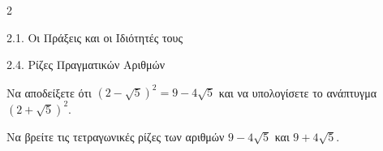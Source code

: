 \begin{ylh}{2}
    \item 2.1. Οι Πράξεις και οι Ιδιότητές τους
    \item 2.4. Ρίζες Πραγματικών Αριθμών
\end{ylh}

\begin{alist}
\item Να αποδείξετε ότι $(2 - \sqrt{5})^2 = 9 - 4\sqrt{5}$ και να υπολογίσετε το ανάπτυγμα $(2 + \sqrt{5})^2$. 
\item Να βρείτε τις τετραγωνικές ρίζες των αριθμών $9 - 4\sqrt{5}$ και $9 + 4\sqrt{5}$. 
\end{alist}

